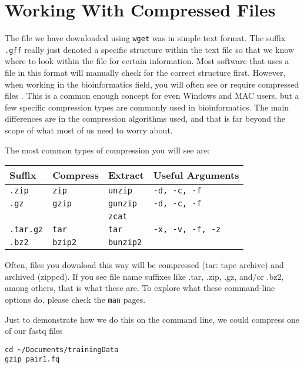 \section{Working With Compressed Files}

\begin{information}
The file we have downloaded using \texttt{wget} was in simple text format.
The suffix \texttt{.gff} really just denoted a specific structure within the text file so that we know where to look within the file for certain information.
Most software that uses a file in this format will manually check for the correct structure first.
However, when working in the bioinformatics field,  you will often see or require compressed files .
This is a common enough concept for even Windows and MAC users, but a few specific compression types are commonly used in bioinformatics.
The main differences are in the compression algorithms used, and that is far beyond the scope of what most of us need to worry about.
\end{information}

The most common types of compression you will see are:\\
\begin{center}
	\begin{tabular}{ p{2cm}  p{3cm}  p{3cm}   p{4cm}}
		\toprule
		\textbf{Suffix} & \textbf{Compress} & \textbf{Extract} & \textbf{Useful Arguments} \\
		\midrule
		\texttt{.zip} & \texttt{zip} & \texttt{unzip} & \texttt{-d, -c, -f} \\
		\midrule
		\texttt{.gz} & \texttt{gzip} & \texttt{gunzip} & \texttt{-d, -c, -f} \\
								 &								& \texttt{zcat} & \\
		\midrule
		\texttt{.tar.gz} & \texttt{tar} & \texttt{tar} & \texttt{-x, -v, -f, -z} \\
		\midrule
		\texttt{.bz2} & \texttt{bzip2} & \texttt{bunzip2} & \\
		\bottomrule
	\end{tabular}
\end{center}

Often, files you download this way will be compressed (tar: tape archive) and archived (zipped). 
If you see file name suffixes like .tar, .zip, .gz, and/or .bz2, among others, that is what these are.  
To explore what these command-line options do, please check the \texttt{man} pages. \\

\begin{steps}
Just to demonstrate how we do this on the command line, we could compress one of our fastq files
\begin{lstlisting}
cd ~/Documents/trainingData
gzip pair1.fq
\end{lstlisting}
\end{steps}

